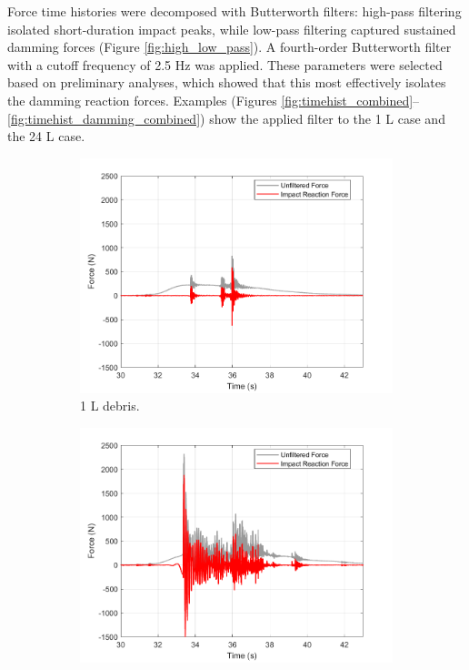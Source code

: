 \documentclass{article}
\begin{document}
{Force time histories were decomposed with Butterworth filters: high-pass filtering isolated short-duration impact peaks, while low-pass filtering captured sustained damming forces (Figure \ref{fig:high_low_pass}). A fourth-order Butterworth filter with a cutoff frequency of 2.5 Hz was applied. These parameters were selected based on preliminary analyses, which showed that this most effectively isolates the damming reaction forces. Examples (Figures \ref{fig:timehist_combined}–\ref{fig:timehist_damming_combined}) show the applied filter to the 1 L case and the 24 L case. 

\begin{figure}[h!]
    \centering
    \begin{subfigure}[b]{0.48\textwidth}
        \centering
        \includegraphics[width=\textwidth]{Reg_Lift_U_1_L_D__Masters_NHERIDeprisImpact2_goodtests_Reg_Lift_U_1_L_Trial04_Peak.png}
        \caption{1 L debris.}
        \label{fig:timehist_1L_peak}
    \end{subfigure}
    \hfill
    \begin{subfigure}[b]{0.48\textwidth}
        \centering
        \includegraphics[width=\textwidth]{Reg_Lift_U_24_L_D__Masters_NHERIDeprisImpact2_goodtests_Reg_Lift_U_24_L_Trial04_Peak.png}

\end{subfigure}
\end{figure}}
\end{document}
